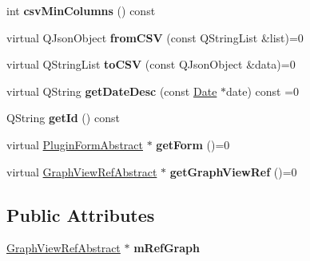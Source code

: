 \begin{DoxyCompactItemize}
\item 
\hypertarget{class_plugin_abstract_ac7cdb44dd3b6655d8f8cd32ff455e531}{int {\bfseries csv\-Min\-Columns} () const }\label{class_plugin_abstract_ac7cdb44dd3b6655d8f8cd32ff455e531}

\item 
\hypertarget{class_plugin_abstract_a63485f8f7b59a8b7ec81e20e09f73c3a}{virtual Q\-Json\-Object {\bfseries from\-C\-S\-V} (const Q\-String\-List \&list)=0}\label{class_plugin_abstract_a63485f8f7b59a8b7ec81e20e09f73c3a}

\item 
\hypertarget{class_plugin_abstract_ab3fcb8e0fb50d2e145e05ceaded2651c}{virtual Q\-String\-List {\bfseries to\-C\-S\-V} (const Q\-Json\-Object \&data)=0}\label{class_plugin_abstract_ab3fcb8e0fb50d2e145e05ceaded2651c}

\item 
\hypertarget{class_plugin_abstract_a2ed6f489236a2b1e42cdda37031bec80}{virtual Q\-String {\bfseries get\-Date\-Desc} (const \hyperlink{class_date}{Date} $\ast$date) const =0}\label{class_plugin_abstract_a2ed6f489236a2b1e42cdda37031bec80}

\item 
\hypertarget{class_plugin_abstract_af8159e19f3aaa4170980e26c266069a3}{Q\-String {\bfseries get\-Id} () const }\label{class_plugin_abstract_af8159e19f3aaa4170980e26c266069a3}

\item 
\hypertarget{class_plugin_abstract_ad5040d6f4765e4a4a911c9e6dfbfd49b}{virtual \hyperlink{class_plugin_form_abstract}{Plugin\-Form\-Abstract} $\ast$ {\bfseries get\-Form} ()=0}\label{class_plugin_abstract_ad5040d6f4765e4a4a911c9e6dfbfd49b}

\item 
\hypertarget{class_plugin_abstract_a082a8ae68dc86144299a2a89ea5934d3}{virtual \hyperlink{class_graph_view_ref_abstract}{Graph\-View\-Ref\-Abstract} $\ast$ {\bfseries get\-Graph\-View\-Ref} ()=0}\label{class_plugin_abstract_a082a8ae68dc86144299a2a89ea5934d3}

\end{DoxyCompactItemize}
\subsection*{Public Attributes}
\begin{DoxyCompactItemize}
\item 
\hypertarget{class_plugin_abstract_a27d7d91234a0f788a914025667be96c6}{\hyperlink{class_graph_view_ref_abstract}{Graph\-View\-Ref\-Abstract} $\ast$ {\bfseries m\-Ref\-Graph}}\label{class_plugin_abstract_a27d7d91234a0f788a914025667be96c6}

\end{DoxyCompactItemize}


